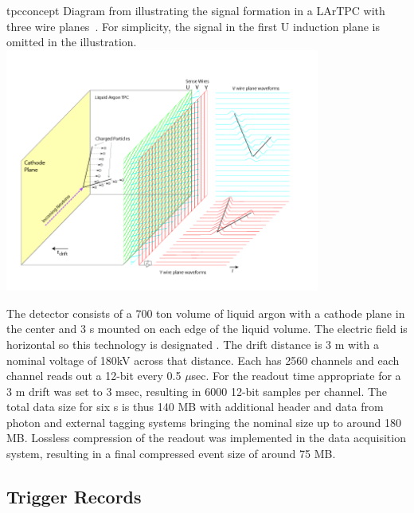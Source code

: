 \documentclass[../main-v1.tex]{subfiles}
\begin{document}
\begin{dunefigure}
{tpcconcept} %
{Diagram  from    illustrating the signal formation in a LArTPC with three wire planes~\cite{Acciarri:2016smi}. For simplicity, the signal in the first U induction plane is omitted in the illustration. }
\includegraphics[trim={0cm 0.6cm 2.5cm 0.7cm},clip,height=8cm]{graphics/IntroFigures/Fig_04_LArTPC_Concept.png}
\end{dunefigure}

The  detector consists of a 700 ton volume of liquid argon with a cathode plane in the center and 3 s mounted on  each  edge of the liquid volume. The electric field is horizontal so this technology is designated .   The drift distance is  3 m with  a nominal voltage of 180kV  across that distance.  Each  has 2560 channels and each channel reads out a 12-bit  every 0.5 $\mu$sec.   For  the readout time appropriate for a 3 m drift was set to 3 msec, resulting in 6000 12-bit samples per channel.  The total data size for six s is thus 140 MB with additional header and data from photon and external tagging systems bringing the nominal  size up to around 180 MB.  Lossless compression of the  readout was implemented in the data acquisition system, resulting in a final compressed event size of around 75 MB. 


\subsection{Trigger Records}
\end{document}
